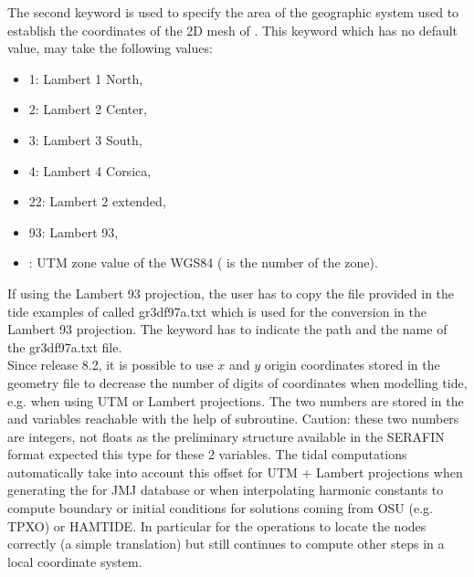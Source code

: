 The second keyword is used to specify the area of the geographic system used
to establish the coordinates of the 2D mesh of .
This keyword  which has no default
value, may take the following values:

\begin{itemize}
\item 1: Lambert 1 North,

\item 2: Lambert 2 Center,

\item 3: Lambert 3 South,

\item 4: Lambert 4 Corsica,

\item 22: Lambert 2 extended,

\item 93: Lambert 93,

\item {}: UTM zone value of the WGS84 (
is the number of the zone).
\end{itemize}

If using the Lambert 93 projection, the user has to copy the file provided
in the tide examples of  called gr3df97a.txt which is used
for the conversion in the Lambert 93 projection.
The keyword  has to indicate the path
and the name of the gr3df97a.txt file.
\\

Since release 8.2, it is possible to use $x$ and $y$ origin coordinates stored
in the geometry file to decrease the number of digits of coordinates
when modelling tide, e.g. when using UTM or Lambert projections.
The two numbers are stored in the  and 
variables reachable with the help of  subroutine.
Caution: these two numbers are integers, not floats as the preliminary structure
available in the SERAFIN format expected this type for these 2 variables.
The tidal computations automatically take into account this offset for
UTM + Lambert projections when generating the 
for JMJ database or when interpolating harmonic constants to compute boundary
or initial conditions for solutions coming from OSU (e.g. TPXO) or HAMTIDE.
In particular for the operations to locate the nodes correctly (a simple
translation) but  still continues to compute other steps in a local
coordinate system.

